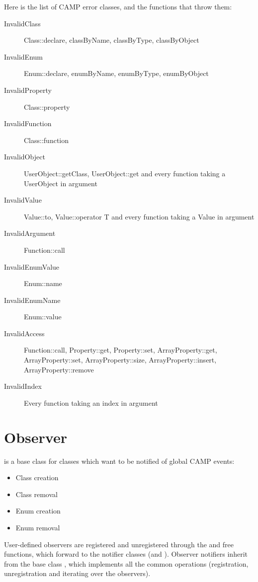 \documentclass[a4paper, twoside]{report}
\begin{document}

	Here is the list of CAMP error classes, and the functions that throw them:
	
	\begin{description}
		\item[InvalidClass] Class::declare, classByName, classByType, classByObject
		\item[InvalidEnum] Enum::declare, enumByName, enumByType, enumByObject
		\item[InvalidProperty] Class::property
		\item[InvalidFunction] Class::function
		\item[InvalidObject] UserObject::getClass, UserObject::get and every function taking a UserObject in argument
		\item[InvalidValue] Value::to, Value::operator T and every function taking a Value in argument
		\item[InvalidArgument] Function::call
		\item[InvalidEnumValue] Enum::name
		\item[InvalidEnumName] Enum::value
		\item[InvalidAccess] Function::call, Property::get, Property::set, ArrayProperty::get,
                         ArrayProperty::set, ArrayProperty::size, ArrayProperty::insert, ArrayProperty::remove
		\item[InvalidIndex] Every function taking an index in argument
	\end{description}

\chapter{Observer}

	\verb@Observer@ is a base class for classes which want to be notified of global CAMP events:
	
	\begin{itemize}
		\item Class creation
		\item Class removal
		\item Enum creation
		\item Enum removal
	\end{itemize}
	
	User-defined observers are registered and unregistered through the \verb@addObserver@ and \verb@removeObserver@ free functions,
	which forward to the notifier classes (\verb@ClassManager@ and \verb@EnumManager@). Observer notifiers inherit from the base
	class \verb@ObserverNotifier@, which implements all the common operations (registration, unregistration and iterating over the observers).
	
\end{document}
